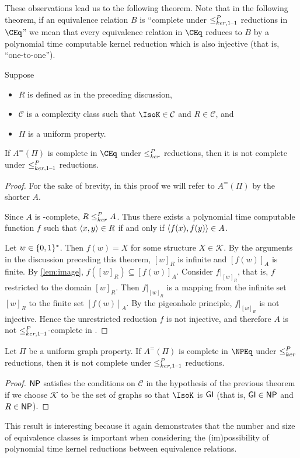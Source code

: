 These observations lead us to the following theorem.
Note that in the following theorem, if an equivalence relation $B$ is ``complete under $\leq^{P}_{ker,1\text{--}1}$ reductions in $\CEq$'' we mean that every equivalence relation in $\CEq$ reduces to $B$ by a polynomial time computable kernel reduction which is also injective (that is, ``one-to-one'').

\begin{theorem}
  Suppose
  \begin{itemize}
  \item $R$ is defined as in the preceding discussion,
  \item $\mathcal{C}$ is a complexity class such that $\IsoK\in\mathcal{C}$ and $R\in\mathcal{C}$, and
  \item $\Pi$ is a uniform property.
  \end{itemize}
  If $A^=(\Pi)$ is complete in $\CEq$ under $\leq^{P}_{ker}$ reductions, then it is not complete under $\leq^{P}_{ker,1\text{--}1}$ reductions.
\end{theorem}
\begin{proof}
  For the sake of brevity, in this proof we will refer to $A^=(\Pi)$ by the shorter $A$.

  Since $A$ is \CEq-complete, $R\leq^{P}_{ker} A$.
  Thus there exists a polynomial time computable function $f$ such that $\left\langle x,y\right\rangle\in R$ if and only if $\left\langle f(x),f(y)\right\rangle\in A$.

  Let $w\in\{0, 1\}^{*}$.
  Then $f(w)=X$ for some structure $X\in\mathcal{K}$.
  By the arguments in the discussion preceding this theorem, $[w]_R$ is infinite and $[f(w)]_A$ is finite.
  By \autoref{lem:image}, $f([w]_R)\subseteq [f(w)]_A$.
  Consider $f|_{[w]_R}$, that is, $f$ restricted to the domain $[w]_R$.
  Then $f|_{[w]_R}$ is a mapping from the infinite set $[w]_R$ to the finite set $[f(w)]_A$.
  By the pigeonhole principle, $f|_{[w]_R}$ is not injective.
  Hence the unrestricted reduction $f$ is not injective, and therefore $A$ is not $\leq^{P}_{ker,1\text{--}1}$-complete in \CEq.
\end{proof}

\begin{corollary}
  Let $\Pi$ be a uniform graph property.
  If $A^=(\Pi)$ is complete in $\NPEq$ under $\leq^{P}_{ker}$ reductions, then it is not complete under $\leq^{P}_{ker,1\text{--}1}$ reductions.
\end{corollary}
\begin{proof}
  ${\mathsf{NP}}$ satisfies the conditions on $\mathcal{C}$ in the hypothesis of the previous theorem if we choose $\mathcal{K}$ to be the set of graphs so that $\IsoK$ is ${\mathsf{GI}}$ (that is, ${\mathsf{GI}}\in{\ensuremath{\mathsf{NP}}}$ and $R\in{\ensuremath{\mathsf{NP}}}$).
\end{proof}

This result is interesting because it again demonstrates that the number and size of equivalence classes is important when considering the (im)possibility of polynomial time kernel reductions between equivalence relations.
